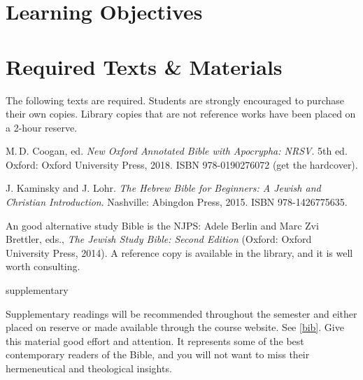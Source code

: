 \documentclass[titlepage]{article}
\newcommand\incl{../includes}
\begin{document}


  \section{Learning Objectives}
  \label{objectives}

  \edobject

\section{Required Texts \& Materials}
\label{texts}

The following texts are required. Students are strongly encouraged to
purchase their own copies. Library copies that are not reference works
have been placed on a 2-hour reserve.

\begingroup
\renewcommand{\section}[2]{}%
\begin{thebibliography}{NRSV}%

	 M.\,D. Coogan, ed.
    \emph{New Oxford Annotated Bible with Apocrypha: NRSV}. 5th ed.
    Oxford: Oxford University Press, 2018.
    ISBN 978-0190276072 (get the hardcover).

	 J. Kaminsky and J. Lohr.
	\emph{The Hebrew Bible for Beginners: A Jewish and Christian Introduction}.
	Nashville: Abingdon Press, 2015.
	ISBN 978-1426775635.

\end{thebibliography}
\endgroup

An good alternative study Bible is the NJPS: Adele Berlin and Marc Zvi
Brettler, eds., \emph{The Jewish Study Bible: Second Edition} (Oxford:
Oxford University Press, 2014). A reference copy is available in the
library, and it is well worth consulting.

\section{Supplementary Texts}
\label{supplementary}

Supplementary readings will be recommended throughout the semester and
either placed on reserve or made available through the course website.
See \autoref{bib}. Give this material good effort and attention. It
represents some of the best contemporary readers of the Bible, and you
will not want to miss their hermeneutical and theological insights.
\end{document}
